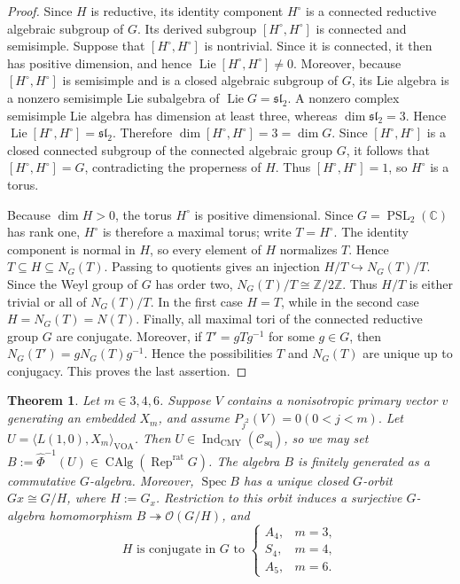 \documentclass[12pt,leqno]{amsart}
\numberwithin{equation}{section} \newtheorem{thm}{Theorem}[section] \newtheorem{lem}[thm]{Lemma} \newtheorem{ex}[thm]{Example} \newtheorem{prop}[thm]{Proposition} \newtheorem{cor}[thm]{Corollary} \newtheorem{defi}[thm]{Definition} \newtheorem{rmk}[thm]{Remark} \newtheorem{notation}[thm]{Notation}
\newcommand{\Rep}{\operatorname{Rep}}
\newcommand{\Spec}{\operatorname{Spec}}
\newcommand{\PSL}{\operatorname{PSL}}
\newcommand{\OO}{\mathcal O}
\newcommand{\Csq}{\mathcal C_{\mathrm{sq}}}
\newcommand{\CAlg}{\operatorname{CAlg}}
\newcommand{\IndCMY}{\operatorname{Ind}_{\mathrm{CMY}}}
\def\Z{\mathbb{Z}} \def\N{\mathbb{N}} \def\A{\mathbb{A}} \def\C{\mathbb{C}} \def\R{\mathbb{R}} \def\Q{\mathbb{Q}} \def\F{\mathbb{F}}
\begin{document}
\begin{proof}
Since $H$ is reductive, its identity component $H^\circ$ is a connected reductive algebraic subgroup of $G$. Its derived subgroup $[H^\circ,H^\circ]$ is connected and semisimple. Suppose that $[H^\circ,H^\circ]$ is nontrivial. Since it is connected, it then has positive dimension, and hence \(\operatorname{Lie}[H^\circ,H^\circ]\neq0.\) Moreover, because $[H^\circ,H^\circ]$ is semisimple and is a closed algebraic subgroup of $G$, its Lie algebra is a nonzero semisimple Lie subalgebra of \(\operatorname{Lie}G=\mathfrak{sl}_2.\) A nonzero complex semisimple Lie algebra has dimension at least three, whereas $\dim\mathfrak{sl}_2=3$. Hence \(\operatorname{Lie}[H^\circ,H^\circ]=\mathfrak{sl}_2.\) Therefore $\dim[H^\circ,H^\circ]=3=\dim G$. Since $[H^\circ,H^\circ]$ is a closed connected subgroup of the connected algebraic group $G$, it follows that $[H^\circ,H^\circ]=G$, contradicting the properness of $H$. Thus $[H^\circ,H^\circ]=1$, so $H^\circ$ is a torus.

Because $\dim H>0$, the torus $H^\circ$ is positive dimensional. Since $G=\PSL_2(\C)$ has rank one, $H^\circ$ is therefore a maximal torus; write $T=H^\circ$. The identity component is normal in $H$, so every element of $H$ normalizes $T$. Hence \(T\subseteq H\subseteq N_G(T).\) Passing to quotients gives an injection \(H/T\hookrightarrow N_G(T)/T.\) Since the Weyl group of $G$ has order two, $N_G(T)/T\cong\Z/2\Z$. Thus $H/T$ is either trivial or all of $N_G(T)/T$. In the first case $H=T$, while in the second case $H=N_G(T)=N(T)$. Finally, all maximal tori of the connected reductive group $G$ are conjugate. Moreover, if $T'=gTg^{-1}$ for some $g\in G$, then \(N_G(T')=gN_G(T)g^{-1}.\) Hence the possibilities $T$ and $N_G(T)$ are unique up to conjugacy. This proves the last assertion.
\end{proof}

\begin{thm}\label{thm:closed-orbit}
Let $m\in{3,4,6}$. Suppose $V$ contains a nonisotropic primary vector $v$ generating an embedded $X_m$, and assume \(P_{j^2}(V)=0(0<j<m).\) Let \(U=\langle L(1,0),X_m\rangle_{\mathrm{VOA}}\). Then \(U\in\IndCMY(\Csq)\), so we may set \(B:=\widehat\Phi^{-1}(U)\in\CAlg(\Rep^{\mathrm{rat}}G)\). The algebra $B$ is finitely generated as a commutative $G$-algebra. Moreover, $\Spec B$ has a unique closed $G$-orbit \(Gx\cong G/H\), where \(H:=G_x\). Restriction to this orbit induces a surjective $G$-algebra homomorphism \(B\twoheadrightarrow\OO(G/H)\), and $$ H\text{ is conjugate in }G\text{ to }
\begin{cases}
A_4,&m=3,\\
S_4,&m=4,\\
A_5,&m=6.
\end{cases}
$$
\end{thm}
\end{document}
